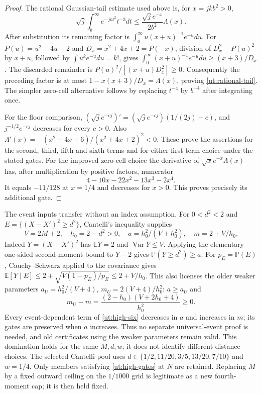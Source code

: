 \documentclass[aop,preprint]{imsart}
\theoremstyle{definition}
\newcommand{\E}{\mathbb E}
\newcommand{\PP}{\mathbb P}
\numberwithin{equation}{section}
\begin{document}
\begin{proof}
The rational Gaussian-tail estimate used above is, for $x=jk b^2>0$,
\begin{equation}\label{ut:rational-tail}
 \sqrt j\int_b^\infty e^{-jkt^2}t^{-3}dt
 \le\frac{\sqrt j e^{-x}}{2b^2}\Lambda(x).
\end{equation}
After substitution its remaining factor is
$\int_0^\infty u(x+u)^{-1}e^{-u}du$.
For $P(u)=u^2-4u+2$ and $D_x=x^2+4x+2=P(-x)$,
division of $D_x^2-P(u)^2$ by $x+u$, followed by
$\int u^ke^{-u}du=k!$, gives
$\int_0^\infty (x+u)^{-1}e^{-u}du\ge(x+3)/D_x$.
The discarded remainder is $P(u)^2/[(x+u)D_x^2]\ge0$.
Consequently the preceding factor is at most
$1-x(x+3)/D_x=\Lambda(x)$, proving
\eqref{ut:rational-tail}. The simpler zero-cell alternative follows
by replacing $t^{-4}$ by $b^{-4}$ after integrating once.

For the floor comparison,
$(\sqrt j e^{-cj})'=(\sqrt j e^{-cj})(1/(2j)-c)$,
and $j^{-1/2}e^{-cj}$ decreases for every $c>0$.
Also $\Lambda'(x)=-(x^2+4x+6)/(x^2+4x+2)^2<0$.
These prove the assertions for the second, third, fifth and sixth
terms and for either first-term choice under the stated gates.
For the improved zero-cell choice the derivative of
$\sqrt x e^{-x}\Lambda(x)$ has, after multiplication by positive
factors, numerator
\[
 4-10x-22x^2-13x^3-2x^4.
\]
It equals $-11/128$ at $x=1/4$ and decreases for $x>0$.
This proves precisely its additional gate.
\end{proof}

The event inputs transfer without an index assumption. For $0<d^2<2$
and $E=\{(X-X')^2\ge d^2\}$, Cantelli's inequality supplies
\[
 V=2M+2,\quad h_0=2-d^2>0,\quad
 a=h_0^2/(V+h_0^2),\quad m=2+V/h_0.
\]
Indeed $Y=(X-X')^2$ has $\E Y=2$ and
$\operatorname{Var}Y\le V$. Applying the elementary one-sided
second-moment bound to $Y-2$ gives $\PP(Y\ge d^2)\ge a$.
For $p_E=\PP(E)$, Cauchy--Schwarz applied to the covariance gives
$\E[Y\mid E]\le2+\sqrt{V(1-p_E)/p_E}\le2+V/h_0$.
This also licenses the older weaker parameters
$a_U=h_0^2/(V+4)$, $m_U=2(V+4)/h_0^2$:
$a\ge a_U$ and
\[
 m_U-m=\frac{(2-h_0)(V+2h_0+4)}{h_0^2}\ge0.
\]
Every event-dependent term of \eqref{ut:high-six} decreases in $a$
and increases in $m$; its gates are preserved when $a$ increases.
Thus no separate universal-event proof is needed, and old certificates
using the weaker parameters remain valid. This domination holds for
the same $M,d,w$; it does not identify different distance choices.
The selected Cantelli pool uses
$d\in\{1/2,11/20,3/5,13/20,7/10\}$ and $w=1/4$.
Only members satisfying \eqref{ut:high-gates} at $N$ are retained.
Replacing $M$ by a fixed outward ceiling on the $1/1000$ grid
is legitimate as a new fourth-moment cap; it is then held fixed.
\end{document}
